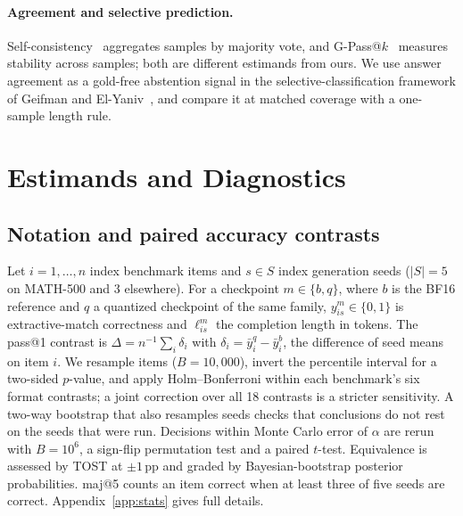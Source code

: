 \documentclass[11pt,a4paper]{article}
\begin{document}
\paragraph{Agreement and selective prediction.} Self-consistency~\cite{wang2022selfconsistency} aggregates samples by majority vote, and G-Pass@$k$~\cite{liu2025gpass} measures stability across samples; both are different estimands from ours. We use answer agreement as a gold-free abstention signal in the selective-classification framework of Geifman and El-Yaniv~\cite{geifman2017selective}, and compare it at matched coverage with a one-sample length rule.

\section{Estimands and Diagnostics}
\label{sec:metrics}
\subsection{Notation and paired accuracy contrasts}
Let $i=1,\dots,n$ index benchmark items and $s\in S$ index generation seeds ($|S|=5$ on MATH-500 and $3$ elsewhere). For a checkpoint $m\in\{b,q\}$, where $b$ is the BF16 reference and $q$ a quantized checkpoint of the same family, $y^m_{is}\in\{0,1\}$ is extractive-match correctness and $\ell^m_{is}$ the completion length in tokens. The pass@1 contrast is $\Delta=n^{-1}\sum_i\delta_i$ with $\delta_i=\bar y^{q}_{i}-\bar y^{b}_{i}$, the difference of seed means on item $i$. We resample items ($B=10{,}000$), invert the percentile interval for a two-sided $p$-value, and apply Holm--Bonferroni within each benchmark's six format contrasts; a joint correction over all 18 contrasts is a stricter sensitivity. A two-way bootstrap that also resamples seeds checks that conclusions do not rest on the seeds that were run. Decisions within Monte Carlo error of $\alpha$ are rerun with $B=10^6$, a sign-flip permutation test and a paired $t$-test. Equivalence is assessed by TOST at $\pm1$\,pp and graded by Bayesian-bootstrap posterior probabilities. maj@5 counts an item correct when at least three of five seeds are correct. Appendix~\ref{app:stats} gives full details.
\end{document}
